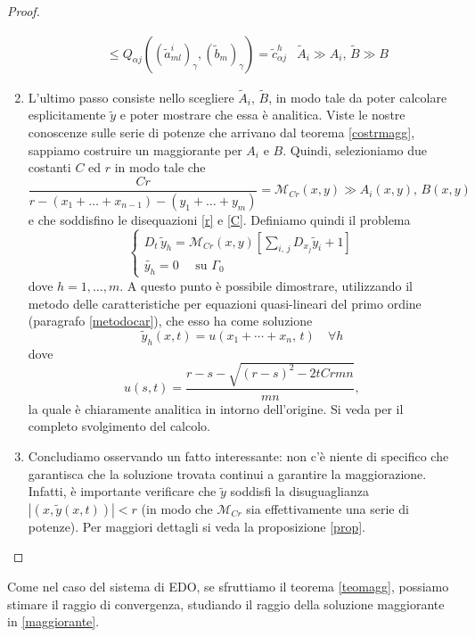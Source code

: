 \begin{proof}
\begin{enumerate}
\begin{align*}
&\leq Q_{\alpha j}\left((\widetilde{a}^i_{ml})_\gamma, (\widetilde{b}_m)_\gamma\right) = \widetilde{c}^h_{\alpha j}
& \widetilde{A}_i \gg A_i, \, \widetilde{B} \gg B
\end{align*}
\item L'ultimo passo consiste nello scegliere $\widetilde{A}_i, \, \widetilde{B}$, in modo tale da poter calcolare esplicitamente $\widetilde{y}$ e poter mostrare che essa è analitica. Viste le nostre conoscenze sulle serie di potenze che arrivano dal teorema \ref{costrmagg}, sappiamo costruire un maggiorante per $A_i$ e $B$. Quindi, selezioniamo due costanti $C$ ed $r$ in modo tale che 
$$\frac{Cr}{r-(x_1+\ldots +x_{n-1})-(y_1+\ldots +y_m)}=\mathcal{M}_{Cr}(x,y) \gg A_i(x,y),\, B(x,y)$$
e che soddisfino le disequazioni \eqref{r} e \eqref{C}. Definiamo quindi il problema
\begin{equation*}
\begin{cases}
D_t \, \widetilde{y}_h = \mathcal{M}_{Cr} (x,y) \left[\sum\limits_{i,\, j} D_{x_j}\widetilde{y}_i+1 \right] \\
\widetilde{y_h}=0 \quad \text{ su } \Gamma_0
\end{cases}
\end{equation*}
dove $h=1,\ldots, m$. A questo punto è possibile dimostrare, utilizzando il metodo delle caratteristiche per equazioni quasi-lineari del primo ordine (paragrafo \ref{metodocar}), che esso ha come soluzione
\begin{equation}\label{maggiorante}
\widetilde{y}_h(x,t)=u(x_1+\cdots +x_n,\,t) \quad \forall h
\end{equation}
dove
\begin{equation}\label{sol}
u(s,t)=\frac{r-s-\sqrt{(r-s)^2-2tCrmn}}{mn},
\end{equation}
la quale è chiaramente analitica in intorno dell'origine. Si veda \cite[cap.1]{Folland} per il completo svolgimento del calcolo.
\item Concludiamo osservando un fatto interessante: non c'è niente di specifico che garantisca che la soluzione trovata continui a garantire la maggiorazione. Infatti, è importante verificare che $\widetilde{y}$ soddisfi la disuguaglianza $|(x,\widetilde{y}(x,t))|< r$ (in modo che $\mathcal{M}_{Cr}$ sia effettivamente una serie di potenze). Per maggiori dettagli si veda la proposizione \ref{prop}.
\end{enumerate}
\end{proof}

\newpage

Come nel caso del sistema di EDO, se sfruttiamo il teorema \ref{teomagg}, possiamo stimare il raggio di convergenza, studiando il raggio della soluzione maggiorante in \eqref{maggiorante}. 

